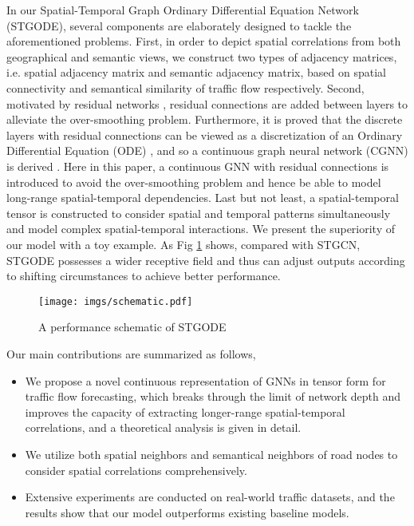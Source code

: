 \documentclass[sigconf]{acmart}
\theoremstyle{definition}
\begin{document}
In our Spatial-Temporal Graph Ordinary Differential Equation Network (STGODE), several components are elaborately designed to tackle the aforementioned problems. First, in order to depict spatial correlations from both geographical and semantic views, we construct two types of adjacency matrices, i.e. spatial adjacency matrix and semantic adjacency matrix, based on spatial connectivity and semantical similarity of traffic flow respectively. Second, motivated by residual networks \cite{he2016deep}, residual connections are added between layers to alleviate the over-smoothing problem.
Furthermore, it is proved that the discrete layers with residual connections can be viewed as a discretization of an Ordinary Differential Equation (ODE) \cite{chen2018neural}, and so a continuous graph neural network (CGNN) is derived \cite{xhonneux2020continuous}. Here in this paper, a continuous GNN with residual connections is introduced to avoid the over-smoothing problem and hence be able to model long-range spatial-temporal dependencies. Last but not least, a spatial-temporal tensor is constructed to consider spatial and temporal patterns simultaneously and model complex spatial-temporal interactions. We present the superiority of our model with a toy example. As Fig \ref{fig:schematic} shows, compared with STGCN, STGODE possesses a wider receptive field and thus can adjust outputs according to shifting circumstances to achieve better performance.
\begin{figure}[ht]
  \centering
  \texttt{[image: imgs/schematic.pdf]}
  \caption{A performance schematic of STGODE}
  \label{fig:schematic}
\end{figure}

Our main contributions are summarized as follows,
\begin{itemize}
  \item We propose a novel continuous representation of GNNs in tensor form for traffic flow forecasting, which breaks through the limit of network depth and improves the capacity of extracting longer-range spatial-temporal correlations, and a theoretical analysis is given in detail.
  \item We utilize both spatial neighbors and semantical neighbors of road nodes to consider spatial correlations comprehensively.
  \item Extensive experiments are conducted on real-world traffic datasets, and the results show that our model outperforms existing baseline models.
\end{itemize}
\end{document}
